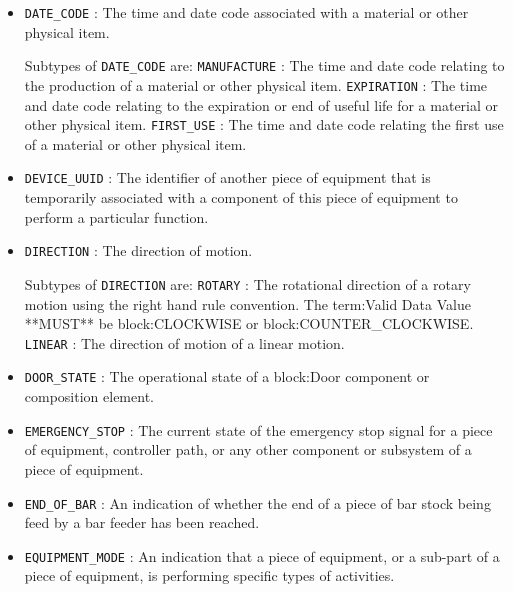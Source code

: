 \begin{itemize}
\item \texttt{DATE_CODE} : The time and date code associated with a material or other physical item. 

Subtypes of \texttt{DATE_CODE} are: 
\newline\tab \texttt{MANUFACTURE} : The time and date code relating to the production of a material or other physical item. 
\newline\tab \texttt{EXPIRATION} : The time and date code relating to the expiration or end of useful life for a material or other physical item. 
\newline\tab \texttt{FIRST_USE} : The time and date code relating the first use of a material or other physical item. 
\item \texttt{DEVICE_UUID} : The identifier of another piece of equipment that is temporarily associated with a component of this piece of equipment to perform a particular function. 

\item \texttt{DIRECTION} : The direction of motion. 

Subtypes of \texttt{DIRECTION} are: 
\newline\tab \texttt{ROTARY} : The rotational direction of a rotary motion using the right hand rule convention.
 The {term:Valid Data Value} **MUST** be {block:CLOCKWISE} or {block:COUNTER_CLOCKWISE}. 
\newline\tab \texttt{LINEAR} : The direction of motion of a linear motion. 
\item \texttt{DOOR_STATE} : The operational state of a {block:Door} component or composition element. 

\item \texttt{EMERGENCY_STOP} : The current state of the emergency stop signal for a piece of equipment, controller path, or any other component or subsystem of a piece of equipment. 

\item \texttt{END_OF_BAR} : An indication of whether the end of a piece of bar stock being feed by a bar feeder has been reached. 

\item \texttt{EQUIPMENT_MODE} : An indication that a piece of equipment, or a sub-part of a piece of equipment, is performing specific types of activities. 


\end{itemize}
